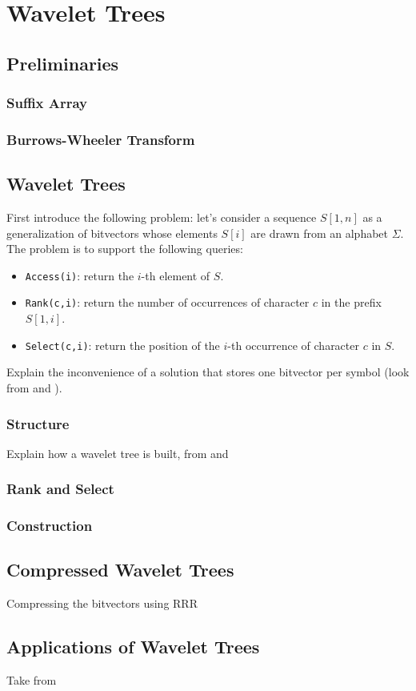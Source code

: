 
\chapter{Wavelet Trees} %

\label{ch:Chapter3} %

\section{Preliminaries}
\subsection{Suffix Array}
\subsection{Burrows-Wheeler Transform}

\section{Wavelet Trees}
First introduce the following problem: let's consider a sequence $S[1,n]$ as a generalization of bitvectors whose elements $S[i]$ are drawn from an alphabet $\Sigma$. The problem is to support the following queries:

\begin{itemize}
    \item \texttt{Access(i)}: return the $i$-th element of $S$.
    \item \texttt{Rank(c,i)}: return the number of occurrences of character $c$ in the prefix $S[1,i]$.
    \item \texttt{Select(c,i)}: return the position of the $i$-th occurrence of character $c$ in $S$.
\end{itemize}

Explain the inconvenience of a solution that stores one bitvector per symbol (look from \citep{navarro2016compact} and \citep{ferragina2023pearls}).

\subsection{Structure}

Explain how a wavelet tree is built, from \citep{navarro2016compact} and \citep{GrossiWT2003}

\subsection{Rank and Select}

\subsection{Construction}

\section{Compressed Wavelet Trees}
Compressing the bitvectors using RRR

\section{Applications of Wavelet Trees}
Take from \citep{WTForALL,WTFromTheoryToPractice,TheMyriadVirtuesWT}

